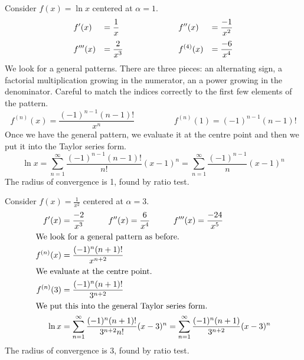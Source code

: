 \documentclass[fleqn,letterpaper]{report}
\begin{document}
\begin{example}
Consider $f(x) = \ln x$ centered at $\alpha = 1$. 
\begin{displaymath}
\begin{array}{*4{>{\displaystyle}l}}
f^\prime(x) & = \frac{1}{x} & 
\hspace{2cm} f^{\prime \prime}(x) & = \frac{-1}{x^2} \\[1em]
f^{\prime \prime \prime}(x) & = \frac{2}{x^3} &
\hspace{2cm} f^{(4)}(x) & = \frac{-6}{x^4} 
\end{array}
\end{displaymath}
We look for a general patterns. There are three
pieces: an alternating sign, a factorial multiplication
growing in the numerator, an a power growing in the
denominator. Careful to match the indices correctly to the
first few elements of the pattern.
\begin{equation*}
f^{(n)}(x) = \frac{(-1)^{n-1}(n-1)!}{x^n} \hspace{2cm} 
f^{(n)}(1) = (-1)^{n-1}(n-1)! 
\end{equation*}
Once we have the general pattern, we evaluate it at
the centre point and then we put it into the Taylor series form.
\begin{equation*}
\ln x = \sum_{n=1}^\infty \frac{(-1)^{n-1}(n-1)!}{n!} (x-1)^n
 = \sum_{n=1}^\infty \frac{(-1)^{n-1}}{n} (x-1)^n
\end{equation*}
The radius of convergence is 1, found by ratio test.
\end{example}

\begin{example}
Consider $f(x) = \frac{1}{x^2}$ centered at $\alpha = 3$. 
\begin{align*}
f^\prime(x) & = \frac{-2}{x^3} \hspace{1cm} 
f^{\prime \prime}(x) = \frac{6}{x^4} \hspace{1cm} 
f^{\prime \prime \prime}(x) = \frac{-24}{x^5} \\
\intertext{We look for a general pattern as before.}
f^{(n)}(x) & = \frac{(-1)^{n}(n+1)!}{x^{n+2}} \\
\intertext{We evaluate at the centre point.}
f^{(n)}(3) & = \frac{(-1)^{n}(n+1)!}{3^{n+2}} \\
\intertext{We put this into the general Taylor series form.}
\ln x & = \sum_{n=1}^\infty \frac{(-1)^{n}(n+1)!}{3^{n+2} n!}
(x-3)^n = \sum_{n=1}^\infty \frac{(-1)^n (n+1)}{3^{n+2}}
(x-3)^n
\end{align*}
The radius of convergence is 3, found by ratio test.
\end{example}
\end{document}

